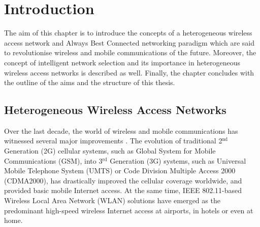 \chapter{Introduction} %
\label{cha:introduction}

\minitoc
\vspace{10mm}

The aim of this chapter is to introduce the concepts of a heterogeneous wireless access network and Always Best Connected networking paradigm which are said to revolutionise wireless and mobile communications of the future. Moreover, the concept of intelligent network selection and its importance in heterogeneous wireless access networks is described as well. Finally, the chapter concludes with the outline of the aims and the structure of this thesis.

\section{Heterogeneous Wireless Access Networks} %
\label{sec:heterogeneous_wireless_access_networks}
Over the last decade, the world of wireless and mobile communications has witnessed several major improvements \cite{ABC03}. The evolution of traditional 2$^\text{nd}$ Generation (2G) cellular systems, such as Global System for Mobile Communications (GSM), into 3$^{\text{rd}}$ Generation (3G) systems, such as Universal Mobile Telephone System (UMTS) or Code Division Multiple Access 2000 (CDMA2000), has drastically improved the cellular coverage worldwide, and provided basic mobile Internet access. At the same time, IEEE 802.11-based Wireless Local Area Network (WLAN) solutions have emerged as the predominant high-speed wireless Internet access at airports, in hotels or even at home.

